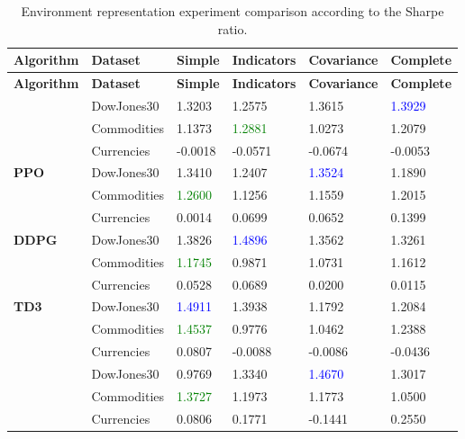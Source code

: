 \begin{longtable}{|p{2cm}|p{2.2cm}|p{2cm}|p{2cm}|p{2.2cm}|p{2cm}|}
    \hline
    \textbf{Algorithm} & \textbf{Dataset} & \textbf{Simple} & \textbf{Indicators} & \textbf{Covariance} & \textbf{Complete} \\ \midrule
    \endfirsthead

    \hline
    \textbf{Algorithm} & \textbf{Dataset} & \textbf{Simple} & \textbf{Indicators} & \textbf{Covariance} & \textbf{Complete}  \\ \midrule
    \endhead

    \caption{Environment representation experiment comparison according to the Sharpe ratio.}
    \label{tab:experiment_environment_sharpe}

    \endfoot

    \hline  
    \multirow{3}{*}{\textbf{A2C}}
    & DowJones30 & 1.3203 & 1.2575 & 1.3615 & \textcolor{blue}{1.3929} \\ \cline{2-6}
    & Commodities & 1.1373 & \textcolor{green}{1.2881} & 1.0273 & 1.2079 \\ \cline{2-6}
    & Currencies & -0.0018 & -0.0571 & -0.0674 & -0.0053 \\ \midrule

    \multirow{3}{*}{\textbf{PPO}}
    & DowJones30 & 1.3410 & 1.2407 & \textcolor{blue}{1.3524} & 1.1890 \\ \cline{2-6}
    & Commodities & \textcolor{green}{1.2600} & 1.1256 & 1.1559 & 1.2015 \\ \cline{2-6}
    & Currencies & 0.0014 & 0.0699 & 0.0652 & 0.1399 \\ \midrule

    \multirow{3}{*}{\textbf{DDPG}}
    & DowJones30 & 1.3826 & \textcolor{blue}{1.4896} & 1.3562 & 1.3261 \\ \cline{2-6}
    & Commodities & \textcolor{green}{1.1745} & 0.9871 & 1.0731 & 1.1612 \\ \cline{2-6}
    & Currencies & 0.0528 & 0.0689 & 0.0200 & 0.0115 \\ \midrule

    \multirow{3}{*}{\textbf{TD3}}
    & DowJones30 & \textcolor{blue}{1.4911} & 1.3938 & 1.1792 & 1.2084 \\ \cline{2-6}
    & Commodities & \textcolor{green}{1.4537} & 0.9776 & 1.0462 & 1.2388 \\ \cline{2-6}
    & Currencies & 0.0807 & -0.0088 & -0.0086 & -0.0436 \\ \midrule
    \pagebreak

    \multirow{3}{*}{\textbf{SAC}}
    & DowJones30 & 0.9769 & 1.3340 & \textcolor{blue}{1.4670} & 1.3017 \\ \cline{2-6}
    & Commodities & \textcolor{green}{1.3727} & 1.1973 & 1.1773 & 1.0500 \\ \cline{2-6}
    & Currencies & 0.0806 & 0.1771 & -0.1441 & 0.2550 \\ \midrule

\end{longtable}